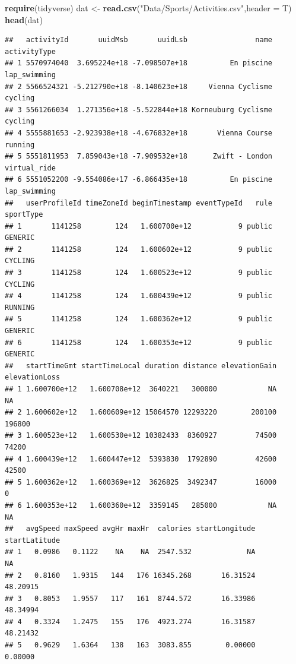 \documentclass[
]{book}
\newenvironment{Shaded}{\begin{snugshade}}{\end{snugshade}}
\newcommand{\DataTypeTok}[1]{\textcolor[rgb]{0.13,0.29,0.53}{#1}}
\newcommand{\KeywordTok}[1]{\textcolor[rgb]{0.13,0.29,0.53}{\textbf{#1}}}
\newcommand{\NormalTok}[1]{#1}
\newcommand{\StringTok}[1]{\textcolor[rgb]{0.31,0.60,0.02}{#1}}
\begin{document}
\begin{Shaded}
\begin{Highlighting}[]
\KeywordTok{require}\NormalTok{(tidyverse)}
\NormalTok{dat <-}\StringTok{ }\KeywordTok{read.csv}\NormalTok{(}\StringTok{"Data/Sports/Activities.csv"}\NormalTok{,}\DataTypeTok{header =}\NormalTok{ T)}
\KeywordTok{head}\NormalTok{(dat)}
\end{Highlighting}
\end{Shaded}

\begin{verbatim}
##   activityId       uuidMsb       uuidLsb                name activityType
## 1 5570974040  3.695224e+18 -7.098507e+18          En piscine lap_swimming
## 2 5566524321 -5.212790e+18 -8.140623e+18     Vienna Cyclisme      cycling
## 3 5561266034  1.271356e+18 -5.522844e+18 Korneuburg Cyclisme      cycling
## 4 5555881653 -2.923938e+18 -4.676832e+18       Vienna Course      running
## 5 5551811953  7.859043e+18 -7.909532e+18      Zwift - London virtual_ride
## 6 5551052200 -9.554086e+17 -6.866435e+18          En piscine lap_swimming
##   userProfileId timeZoneId beginTimestamp eventTypeId   rule sportType
## 1       1141258        124   1.600700e+12           9 public   GENERIC
## 2       1141258        124   1.600602e+12           9 public   CYCLING
## 3       1141258        124   1.600523e+12           9 public   CYCLING
## 4       1141258        124   1.600439e+12           9 public   RUNNING
## 5       1141258        124   1.600362e+12           9 public   GENERIC
## 6       1141258        124   1.600353e+12           9 public   GENERIC
##   startTimeGmt startTimeLocal duration distance elevationGain elevationLoss
## 1 1.600700e+12   1.600708e+12  3640221   300000            NA            NA
## 2 1.600602e+12   1.600609e+12 15064570 12293220        200100        196800
## 3 1.600523e+12   1.600530e+12 10382433  8360927         74500         74200
## 4 1.600439e+12   1.600447e+12  5393830  1792890         42600         42500
## 5 1.600362e+12   1.600369e+12  3626825  3492347         16000             0
## 6 1.600353e+12   1.600360e+12  3359145   285000            NA            NA
##   avgSpeed maxSpeed avgHr maxHr  calories startLongitude startLatitude
## 1   0.0986   0.1122    NA    NA  2547.532             NA            NA
## 2   0.8160   1.9315   144   176 16345.268       16.31524      48.20915
## 3   0.8053   1.9557   117   161  8744.572       16.33986      48.34994
## 4   0.3324   1.2475   155   176  4923.274       16.31587      48.21432
## 5   0.9629   1.6364   138   163  3083.855        0.00000       0.00000

\end{verbatim}
\end{document}

